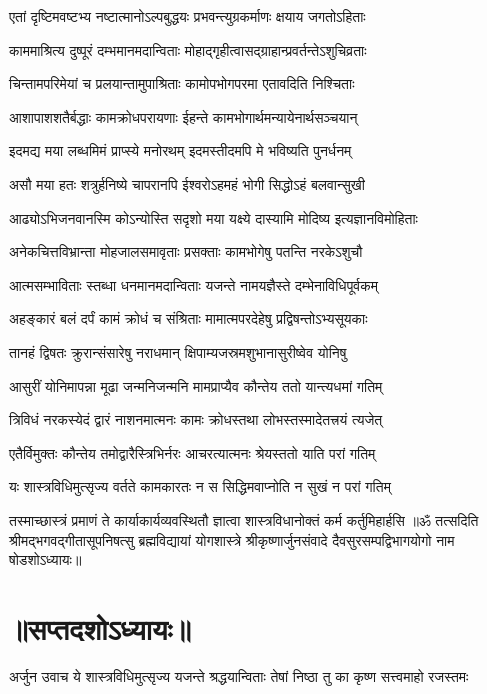 \twolineshloka
{एतां दृष्टिमवष्टभ्य नष्टात्मानोऽल्पबुद्धयः}
{प्रभवन्त्युग्रकर्माणः क्षयाय जगतोऽहिताः}%

\twolineshloka
{काममाश्रित्य दुष्पूरं दम्भमानमदान्विताः}
{मोहाद्गृहीत्वासद्ग्राहान्प्रवर्तन्तेऽशुचिव्रताः}%

\twolineshloka
{चिन्तामपरिमेयां च प्रलयान्तामुपाश्रिताः}
{कामोपभोगपरमा एतावदिति निश्चिताः}%

\twolineshloka
{आशापाशशतैर्बद्धाः कामक्रोधपरायणाः}
{ईहन्ते कामभोगार्थमन्यायेनार्थसञ्चयान्}%

\twolineshloka
{इदमद्य मया लब्धमिमं प्राप्स्ये मनोरथम्}
{इदमस्तीदमपि मे भविष्यति पुनर्धनम्}%

\twolineshloka
{असौ मया हतः शत्रुर्हनिष्ये चापरानपि}
{ईश्वरोऽहमहं भोगी सिद्धोऽहं बलवान्सुखी}%

\twolineshloka
{आढ्योऽभिजनवानस्मि कोऽन्योस्ति सदृशो मया}
{यक्ष्ये दास्यामि मोदिष्य इत्यज्ञानविमोहिताः}%

\twolineshloka
{अनेकचित्तविभ्रान्ता मोहजालसमावृताः}
{प्रसक्ताः कामभोगेषु पतन्ति नरकेऽशुचौ}%

\twolineshloka
{आत्मसम्भाविताः स्तब्धा धनमानमदान्विताः}
{यजन्ते नामयज्ञैस्ते दम्भेनाविधिपूर्वकम्}%

\twolineshloka
{अहङ्कारं बलं दर्पं कामं क्रोधं च संश्रिताः}
{मामात्मपरदेहेषु प्रद्विषन्तोऽभ्यसूयकाः}%

\twolineshloka
{तानहं द्विषतः क्रुरान्संसारेषु नराधमान्}
{क्षिपाम्यजस्रमशुभानासुरीष्वेव योनिषु}%

\twolineshloka
{आसुरीं योनिमापन्ना मूढा जन्मनिजन्मनि}
{मामप्राप्यैव कौन्तेय ततो यान्त्यधमां गतिम्}%

\twolineshloka
{त्रिविधं नरकस्येदं द्वारं नाशनमात्मनः}
{कामः क्रोधस्तथा लोभस्तस्मादेतत्त्रयं त्यजेत्}%

\twolineshloka
{एतैर्विमुक्तः कौन्तेय तमोद्वारैस्त्रिभिर्नरः}
{आचरत्यात्मनः श्रेयस्ततो याति परां गतिम्}%

\twolineshloka
{यः शास्त्रविधिमुत्सृज्य वर्तते कामकारतः}
{न स सिद्धिमवाप्नोति न सुखं न परां गतिम्}%

\twolineshloka
{तस्माच्छास्त्रं प्रमाणं ते कार्याकार्यव्यवस्थितौ}
{ज्ञात्वा शास्त्रविधानोक्तं कर्म कर्तुमिहार्हसि}%
{॥ॐ तत्सदिति श्रीमद्भगवद्गीतासूपनिषत्सु ब्रह्मविद्यायां योगशास्त्रे श्रीकृष्णार्जुनसंवादे दैवसुरसम्पद्विभागयोगो नाम षोडशोऽध्यायः॥}

\section{॥सप्तदशोऽध्यायः॥}
{अर्जुन उवाच}
\twolineshloka
{ये शास्त्रविधिमुत्सृज्य यजन्ते श्रद्धयान्विताः}
{तेषां निष्ठा तु का कृष्ण सत्त्वमाहो रजस्तमः}%


